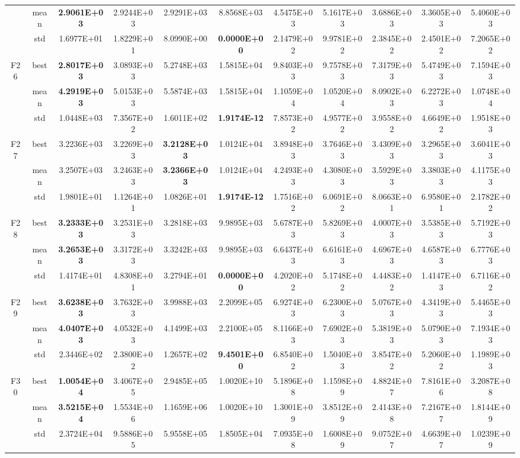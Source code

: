 \documentclass{wzuthesis}
\begin{document}
\begin{longtable}{ccccccccccc}
          & mean  & \textbf{2.9061E+03} & 2.9244E+03 & 2.9291E+03 & 8.8568E+03 & 4.5475E+03 & 5.1617E+03 & 3.6886E+03 & 3.3605E+03 & 5.4060E+03 \\
          & std   & 1.6977E+01 & 1.8229E+01 & 8.0990E+00 & \textbf{0.0000E+00} & 2.1479E+02 & 9.9781E+02 & 2.3845E+02 & 2.4501E+02 & 7.2065E+02 \\
    \multirow{3}[0]{*}{F26} & best  & \textbf{2.8017E+03} & 3.0893E+03 & 5.2748E+03 & 1.5815E+04 & 9.8403E+03 & 9.7578E+03 & 7.3179E+03 & 5.4749E+03 & 7.1594E+03 \\
          & mean  & \textbf{4.2919E+03} & 5.0153E+03 & 5.5874E+03 & 1.5815E+04 & 1.1059E+04 & 1.0520E+04 & 8.0902E+03 & 6.2272E+03 & 1.0748E+04 \\
          & std   & 1.0448E+03 & 7.3567E+02 & 1.6011E+02 & \textbf{1.9174E-12} & 7.8573E+02 & 4.9577E+02 & 3.9558E+02 & 4.6649E+02 & 1.9518E+03 \\
    \multirow{3}[0]{*}{F27} & best  & 3.2236E+03 & 3.2269E+03 & \textbf{3.2128E+03} & 1.0124E+04 & 3.8948E+03 & 3.7646E+03 & 3.4309E+03 & 3.2965E+03 & 3.6041E+03 \\
          & mean  & 3.2507E+03 & 3.2463E+03 & \textbf{3.2366E+03} & 1.0124E+04 & 4.2493E+03 & 4.3080E+03 & 3.5929E+03 & 3.3803E+03 & 4.1175E+03 \\
          & std   & 1.9801E+01 & 1.1264E+01 & 1.0826E+01 & \textbf{1.9174E-12} & 1.7516E+02 & 6.0691E+02 & 8.0663E+01 & 6.9580E+01 & 2.1782E+02 \\
    \multirow{3}[0]{*}{F28} & best  & \textbf{3.2333E+03} & 3.2531E+03 & 3.2818E+03 & 9.9895E+03 & 5.6787E+03 & 5.8269E+03 & 4.0007E+03 & 3.5385E+03 & 5.7192E+03 \\
          & mean  & \textbf{3.2653E+03} & 3.3172E+03 & 3.3242E+03 & 9.9895E+03 & 6.6437E+03 & 6.6161E+03 & 4.6967E+03 & 4.6587E+03 & 6.7776E+03 \\
          & std   & 1.4174E+01 & 4.8308E+01 & 3.2794E+01 & \textbf{0.0000E+00} & 4.2020E+02 & 5.1748E+02 & 4.4483E+02 & 1.4147E+03 & 6.7116E+02 \\
    \multirow{3}[0]{*}{F29} & best  & \textbf{3.6238E+03} & 3.7632E+03 & 3.9988E+03 & 2.2099E+05 & 6.9274E+03 & 6.2300E+03 & 5.0767E+03 & 4.3419E+03 & 5.4465E+03 \\
          & mean  & \textbf{4.0407E+03} & 4.0532E+03 & 4.1499E+03 & 2.2100E+05 & 8.1166E+03 & 7.6902E+03 & 5.3819E+03 & 5.0790E+03 & 7.1934E+03 \\
          & std   & 2.3446E+02 & 2.3800E+02 & 1.2657E+02 & \textbf{9.4501E+00} & 6.8540E+02 & 1.5040E+03 & 3.8547E+02 & 5.2060E+02 & 1.1989E+03 \\
    \multirow{3}[0]{*}{F30} & best  & \textbf{1.0054E+04} & 3.4067E+05 & 2.9485E+05 & 1.0020E+10 & 5.1896E+08 & 1.1598E+09 & 4.8824E+07 & 7.8161E+06 & 3.2087E+08 \\
          & mean  & \textbf{3.5215E+04} & 1.5534E+06 & 1.1659E+06 & 1.0020E+10 & 1.3001E+09 & 3.8512E+09 & 2.4143E+08 & 7.2167E+07 & 1.8144E+09 \\
          & std   & 2.3724E+04 & 9.5886E+05 & 5.9558E+05 & 1.8505E+04 & 7.0935E+08 & 1.6008E+09 & 9.0752E+07 & 4.6639E+07 & 1.0239E+09 \\
\end{longtable}%
\end{document}
